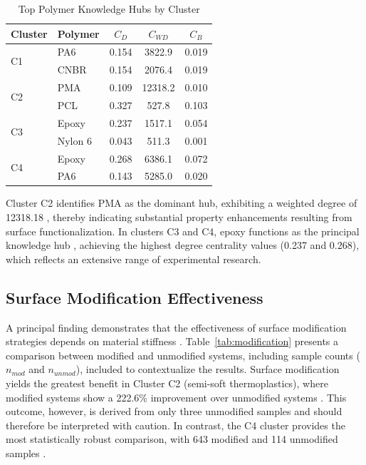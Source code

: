 \documentclass[conference]{IEEEtran}
\begin{document}
\begin{table}[htbp]
\caption{Top Polymer Knowledge Hubs by Cluster}
\begin{center}
\begin{tabular}{@{}llccc@{}}
\toprule
Cluster & Polymer & $C_D$ & $C_{WD}$ & $C_B$ \\
\midrule
\multirow{2}{*}{C1} & PA6 & 0.154 & 3822.9 & 0.019 \\
 & CNBR & 0.154 & 2076.4 & 0.019 \\
\midrule
\multirow{2}{*}{C2} & PMA & 0.109 & 12318.2 & 0.010 \\
 & PCL & 0.327 & 527.8 & 0.103 \\
\midrule
\multirow{2}{*}{C3} & Epoxy & 0.237 & 1517.1 & 0.054 \\
 & Nylon 6 & 0.043 & 511.3 & 0.001 \\
\midrule
\multirow{2}{*}{C4} & Epoxy & 0.268 & 6386.1 & 0.072 \\
 & PA6 & 0.143 & 5285.0 & 0.020 \\
\bottomrule
\end{tabular}
\label{tab:centrality}
\end{center}
\end{table}

Cluster C2 identifies PMA as the dominant hub, exhibiting a weighted degree of 12318.18 \cite{1}, thereby indicating substantial property enhancements resulting from surface functionalization. In clusters C3 and C4, epoxy functions as the principal knowledge hub \cite{47, 49, 92}, achieving the highest degree centrality values (0.237 and 0.268), which reflects an extensive range of experimental research.

\subsection{Surface Modification Effectiveness}

A principal finding demonstrates that the effectiveness of surface modification strategies depends on material stiffness \cite{69, 107, 138}. Table~\ref{tab:modification} presents a comparison between modified and unmodified systems, including sample counts ($n_{mod}$ and $n_{unmod}$), included to contextualize the results. Surface modification yields the greatest benefit in Cluster C2 (semi-soft thermoplastics), where modified systems show a 222.6\% improvement over unmodified systems \cite{1, 90, 134}. This outcome, however, is derived from only three unmodified samples and should therefore be interpreted with caution. In contrast, the C4 cluster provides the most statistically robust comparison, with 643 modified and 114 unmodified samples \cite{80, 92, 127}.
\end{document}
